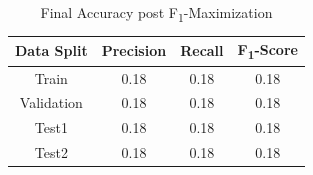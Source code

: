 \begin{table}[t]
\caption{Final Accuracy post F\textsubscript{1}-Maximization}
\vspace{0.1 in}
\centering
\resizebox{3.3in}{!}
{%
\begin{tabular}{|c|c|c|c|}
\hline
{\bf Data Split} & {\bf Precision} & {\bf Recall} & {\bf F\textsubscript{1}-Score} \\ 
\hline\hline 
Train	  		 &  0.18 &  0.18 &  0.18  \\ \hline
Validation	  	 &  0.18 &  0.18 &  0.18  \\ \hline
Test1	  		 &  0.18 &  0.18 &  0.18  \\ \hline
Test2	  		 & 0.18 &  0.18 &  0.18  \\ \hline
\end{tabular}
}
\label{tab:Fscore}
\end{table}